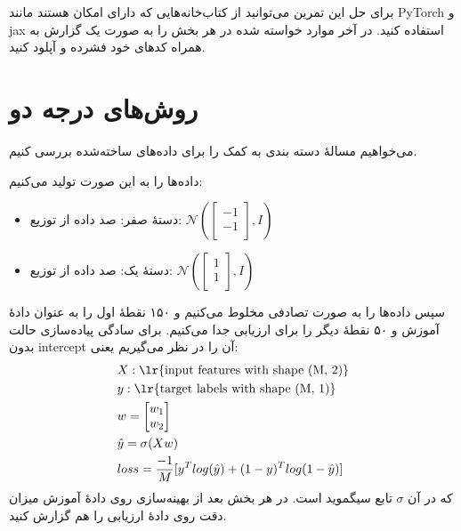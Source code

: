 \documentclass[11pt,a4paper]{article}
\begin{document}
\vspace{0.3cm}
برای حل این تمرین می‌توانید از کتاب‌خانه‌هایی که دارای امکان 
هستند مانند PyTorch و jax استفاده کنید. در آخر موارد خواسته شده در هر بخش را به صورت یک گزارش به همراه کدهای خود فشرده و آپلود کنید.
\section*{روش‌های درجه دو}

می‌خواهیم مسالهٔ دسته بندی به کمک 
 را برای داده‌های ساخته‌شده  بررسی کنیم.

داده‌ها را به این صورت تولید می‌کنیم:
\begin{itemize}
\item
دستهٔ صفر: صد داده از توزیع:
$\mathcal{N}(
\begin{bmatrix} 
-1\\
-1\\
\end{bmatrix}, I)$
\item
دستهٔ یک: صد داده از توزیع:
$\mathcal{N}(
\begin{bmatrix} 
1\\
1\\
\end{bmatrix}, I)$
\end{itemize}
سپس داده‌ها را به صورت تصادفی مخلوط می‌کنیم و ۱۵۰ نقطهٔ اول را به عنوان دادهٔ آموزش و ۵۰ نقطهٔ دیگر را برای ارزیابی جدا می‌کنیم. برای سادگی پیاده‌سازی  حالت بدون intercept آن را در نظر می‌گیریم یعنی:
\begin{align}
&X: \text{\lr{input features with shape (M, 2)}}\\
&y: \text{\lr{target labels with shape (M, 1)}}\\
&w = \begin{bmatrix} 
w_1\\
w_2\\
\end{bmatrix}\\
&\hat{y} = \sigma(Xw)\\
&loss = \frac{-1}{M} [y^T log(\hat{y}) + (1 - y)^Tlog(1 - \hat{y})]
\end{align}
که در آن $\sigma$ تابع سیگموید است. در هر بخش بعد از بهینه‌سازی روی دادهٔ آموزش میزان دقت روی دادهٔ ارزیابی را هم گزارش کنید.
\end{document}
